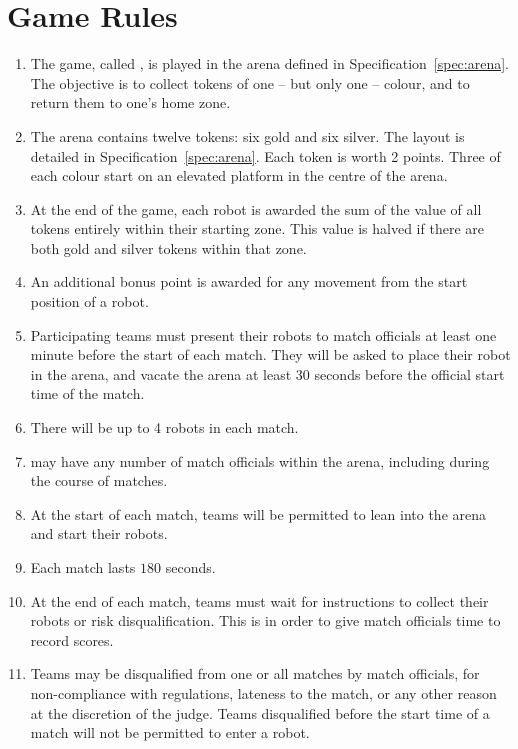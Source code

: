 \section{Game Rules}
\label{sec:rules}

\begin{enumerate}
  \item The game, called \emph{\gamename}, is played in the arena defined in
        Specification~\ref{spec:arena}. The objective is to collect tokens of
        one -- but only one -- colour, and to return them to one's home zone.
  \item The arena contains twelve tokens: six gold and six silver. The layout
        is detailed in Specification~\ref{spec:arena}. Each token is worth 2
        points. Three of each colour start on an elevated platform in the centre
        of the arena.
  \item At the end of the game, each robot is awarded the sum of the value of
        all tokens entirely within their starting zone. This value is halved
        if there are both gold and silver tokens within that zone.
  \item An additional bonus point is awarded for any movement from the start
        position of a robot.
  \item Participating teams must present their robots to match officials at
        least one minute before the start of each match. They will be asked to
        place their robot in the arena, and vacate the arena at least 30 seconds
        before the official start time of the match.
  \item There will be up to 4 robots in each match.
  \item \org may have any number of match officials within the arena, including
        during the course of matches.
  \item At the start of each match, teams will be permitted to lean into the
        arena and start their robots.
  \item Each match lasts $180$ seconds.
  \item At the end of each match, teams must wait for instructions to collect
        their robots or risk disqualification. This is in order to give match
        officials time to record scores.
  \item Teams may be disqualified from one or all matches by match officials,
        for non-compliance with regulations, lateness to the match, or any other
        reason at the discretion of the judge. Teams disqualified before the
        start time of a match will not be permitted to enter a robot.
\end{enumerate}

